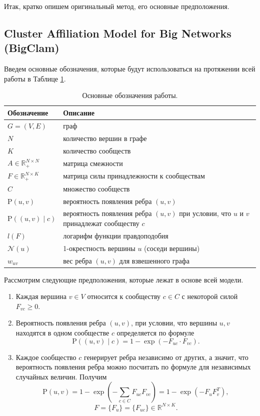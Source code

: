 \documentclass{ITaSconf}
\def\PP{\mathrm{P}}
\begin{document}
	Итак, кратко опишем оригинальный метод, его основные предположения.
	
	\subsection{Cluster Affiliation Model for Big Networks (BigClam)}
	
	Введем основные обозначения, которые будут использоваться на протяжении всей работы в Таблице \ref{table:notation}.
	\begin{table}[!t]
		{
			\centering
			\small
			\begin{tabular}{ p{5.5em} p{17.5em} }
				\hline
				\hline
				Обозначение 						& Описание \\
				\hline
				$G = (V,E) $ 						& граф \\
				$N$									& количество вершин в графе \\
				$K$									& количество сообществ \\
				$A \in \mathbb{R}_{+}^{N\times N}$  & матрица смежности \\
				$F \in \mathbb{R}_{+}^{N\times K}$  & матрица силы принадлежности к сообществам			\\
				$C$									& множество сообществ \\
				$\PP(u,v)$							& вероятность появления ребра $(u,v)$ \\
				$\PP((u,v) \mid c)$ 					& вероятность появления ребра $(u,v)$ при условии, что $u$ и $v$ принадлежат сообществу $c$ \\
				
				$l(F)$								& логарифм функции правдоподобия \\
				$\mathcal{N}(u)$ 					& 1-окрестность вершины $u$ (соседи вершины) \\
				$w_{uv}$							& вес ребра $(u,v)$ для взвешенного графа \\
				\hline
				\hline
			\end{tabular}
		}
		\caption{Основные обозначения работы.}
		\label{table:notation}
	\end{table}
	Рассмотрим следующие предположения, которые лежат в основе всей модели.
	\begin{enumerate}
		\item Каждая вершина $v\in V$ относится к сообществу $c \in C$ с некоторой силой
		$F_{vc} \ge 0.$
		\item Вероятность появления ребра $(u,v)$, при условии, что вершины $u,v$ находятся в одном сообществе $c$ определяется по формуле 
		$$\PP((u,v) \mid c)=1 - \exp(-F_{uc}\cdot F_{vc}).$$
		\item Каждое сообщество $c$ генерирует ребра независимо от других, а значит, что вероятность появления ребра можно посчитать по формуле для независимых случайных величин.
	Получим
		$$\PP(u,v)=1 - \exp(-\sum_{c\in C} F_{uc} F_{vc}) = 1 - \exp( - F_{u} F_{v}^T),$$
		$$F = \{F_u\} = \{F_{uc}\} \in \mathbb {R}^{N \times K}.$$
	\end{enumerate}
	
\end{document}

